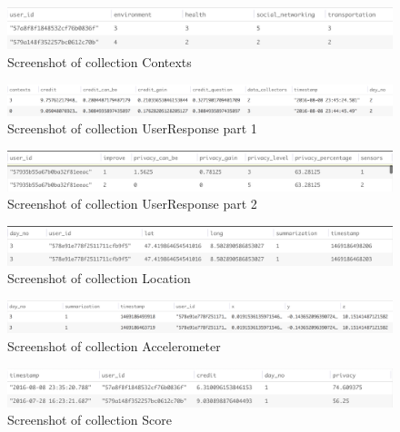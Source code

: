 \begin{figure}[ht!]
\centering
\includegraphics[width=\textwidth,keepaspectratio]{./images/collection_context_cat}
\caption{Screenshot of collection Contexts}
\label{fig:col_c}
\end{figure}

\begin{figure}[ht!]
\centering
\includegraphics[width=\textwidth,keepaspectratio]{./images/collection_ur_1}
\caption{Screenshot of collection UserResponse part 1}
\label{fig:col_ur_1}
\end{figure}

\begin{figure}[ht!]
\centering
\includegraphics[width=\textwidth,keepaspectratio]{./images/collection_ur_2}
\caption{Screenshot of collection UserResponse part 2}
\label{fig:col_ur_2}
\end{figure}

\begin{figure}[ht!]
\centering
\includegraphics[width=\textwidth,keepaspectratio]{./images/collection_loc}
\caption{Screenshot of collection Location}
\label{fig:col_loc}
\end{figure}

\begin{figure}[ht!]
\centering
\includegraphics[width=\textwidth,keepaspectratio]{./images/collection_acc}
\caption{Screenshot of collection Accelerometer}
\label{fig:col_acc}
\end{figure}

\begin{figure}[ht!]
\centering
\includegraphics[width=\textwidth,keepaspectratio]{./images/collection_score}
\caption{Screenshot of collection Score}
\label{fig:col_score}
\end{figure}

